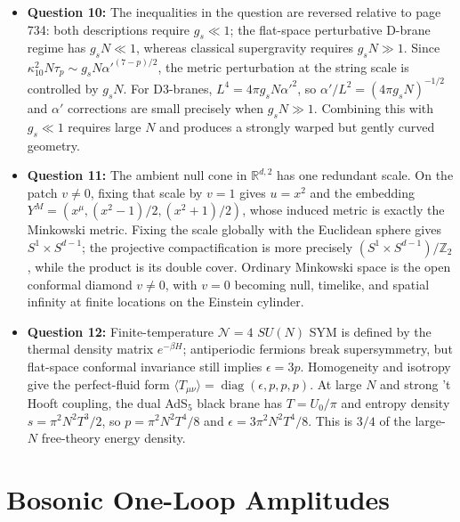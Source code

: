 \documentclass[
  10pt,
  a4paper,
  openany]{book}
\begin{document}
\begin{itemize}
  In F-theory this becomes codimension-two fiber enhancement: additional
  fibral curves collapse only over the brane-intersection locus,
  producing localized matter states, while \(G_4\) flux determines the
  net four-dimensional chirality.
\item
  \textbf{Question 10:} The inequalities in the question are reversed
  relative to page 734: both descriptions require \(g_s\ll1\); the
  flat-space perturbative D-brane regime has \(g_sN\ll1\), whereas
  classical supergravity requires \(g_sN\gg1\). Since
  \(\kappa_{10}^2N\tau_p\sim g_sN\alpha'^{(7-p)/2}\), the metric
  perturbation at the string scale is controlled by \(g_sN\). For
  D3-branes, \(L^4=4\pi g_sN\alpha'^2\), so
  \(\alpha'/L^2=(4\pi g_sN)^{-1/2}\) and \(\alpha'\) corrections are
  small precisely when \(g_sN\gg1\). Combining this with \(g_s\ll1\)
  requires large \(N\) and produces a strongly warped but gently curved
  geometry.
\item
  \textbf{Question 11:} The ambient null cone in \(\mathbb R^{d,2}\) has
  one redundant scale. On the patch \(v\neq0\), fixing that scale by
  \(v=1\) gives \(u=x^2\) and the embedding
  \(Y^M=(x^\mu,(x^2-1)/2,(x^2+1)/2)\), whose induced metric is exactly
  the Minkowski metric. Fixing the scale globally with the Euclidean
  sphere gives \(S^1\times S^{d-1}\); the projective compactification is
  more precisely \((S^1\times S^{d-1})/\mathbb Z_2\), while the product
  is its double cover. Ordinary Minkowski space is the open conformal
  diamond \(v\neq0\), with \(v=0\) becoming null, timelike, and spatial
  infinity at finite locations on the Einstein cylinder.
\item
  \textbf{Question 12:} Finite-temperature \(\mathcal N=4\) \(SU(N)\)
  SYM is defined by the thermal density matrix \(e^{-\beta H}\);
  antiperiodic fermions break supersymmetry, but flat-space conformal
  invariance still implies \(\epsilon=3p\). Homogeneity and isotropy
  give the perfect-fluid form
  \(\langle T_{\mu\nu}\rangle=\operatorname{diag}(\epsilon,p,p,p)\). At
  large \(N\) and strong 't Hooft coupling, the dual AdS\(_5\) black
  brane has \(T=U_0/\pi\) and entropy density \(s=\pi^2N^2T^3/2\), so
  \(p=\pi^2N^2T^4/8\) and \(\epsilon=3\pi^2N^2T^4/8\). This is \(3/4\)
  of the large-\(N\) free-theory energy density.
\end{itemize}

\chapter{Bosonic One-Loop
Amplitudes}\label{bosonic-one-loop-amplitudes-1}
\end{document}
